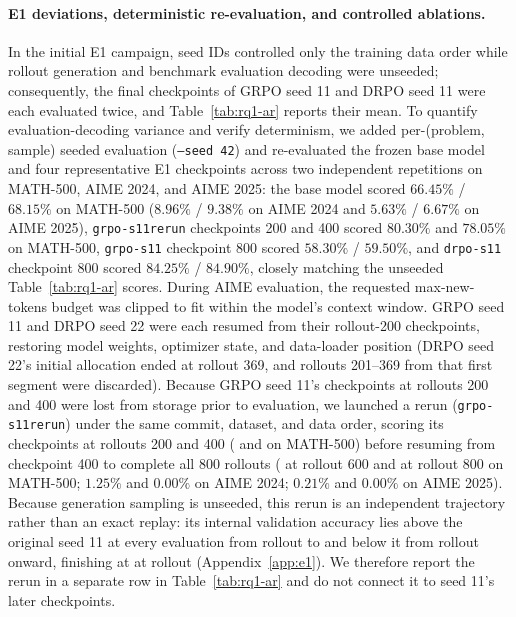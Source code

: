 \documentclass[10pt]{article}
\begin{document}
\paragraph{E1 deviations, deterministic re-evaluation, and controlled ablations.}
In the initial E1 campaign, seed IDs controlled only the training data order while rollout generation and benchmark evaluation decoding were unseeded; consequently, the final checkpoints of GRPO seed 11 and DRPO seed 11 were each evaluated twice, and Table~\ref{tab:rq1-ar} reports their mean.
To quantify evaluation-decoding variance and verify determinism, we added per-(problem, sample) seeded evaluation (\texttt{--seed 42}) and re-evaluated the frozen base model and four representative E1 checkpoints across two independent repetitions on MATH-500, AIME 2024, and AIME 2025: the base model scored $66.45\%$ / $68.15\%$ on MATH-500 ($8.96\%$ / $9.38\%$ on AIME 2024 and $5.63\%$ / $6.67\%$ on AIME 2025), \texttt{grpo-s11rerun} checkpoints 200 and 400 scored $80.30\%$ and $78.05\%$ on MATH-500, \texttt{grpo-s11} checkpoint 800 scored $58.30\%$ / $59.50\%$, and \texttt{drpo-s11} checkpoint 800 scored $84.25\%$ / $84.90\%$, closely matching the unseeded Table~\ref{tab:rq1-ar} scores.
During AIME evaluation, the requested max-new-tokens budget was clipped to fit within the model's context window.
GRPO seed 11 and DRPO seed 22 were each resumed from their rollout-200 checkpoints, restoring model weights, optimizer state, and data-loader position (DRPO seed 22's initial allocation ended at rollout 369, and rollouts 201--369 from that first segment were discarded).
Because GRPO seed 11's checkpoints at rollouts 200 and 400 were lost from storage prior to evaluation, we launched a rerun (\texttt{grpo-s11rerun}) under the same commit, dataset, and data order, scoring its checkpoints at rollouts 200 and 400 (\EOneMathGRPORerunEarly{} and \EOneMathGRPORerunMiddle{} on MATH-500) before resuming from checkpoint 400 to complete all 800 rollouts (\EOneMathGRPORerunSix{} at rollout 600 and \EOneMathGRPORerunEnd{} at rollout 800 on MATH-500; $1.25\%$ and $0.00\%$ on AIME 2024; $0.21\%$ and $0.00\%$ on AIME 2025).
Because generation sampling is unseeded, this rerun is an independent trajectory rather than an exact replay: its internal validation accuracy lies above the original seed 11 at every evaluation from rollout \EOneRerunAboveFrom{} to \EOneRerunAboveTo{} and below it from rollout \EOneRerunBelowFrom{} onward, finishing at \EOneValidRerunLast{} at rollout \EOneRerunLastEval{} (Appendix~\ref{app:e1}).
We therefore report the rerun in a separate row in Table~\ref{tab:rq1-ar} and do not connect it to seed 11's later checkpoints.
\end{document}
